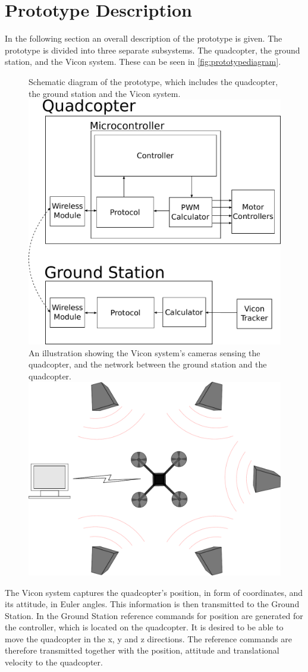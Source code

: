 \section{Prototype Description}\label{sec:PrototypeDescription}
In the following section an overall description of the prototype is given. %
The prototype is divided into three separate subsystems. The quadcopter, the ground station, and the Vicon system. These can be seen in \autoref{fig:prototypediagram}. 

\begin{figure}[H]
  \centering
  \captionbox
  {
    Schematic diagram of the prototype, which includes the quadcopter, the ground station and the Vicon system.
    \label{fig:prototypediagram}
  }
  {
    \includegraphics[width=.5\textwidth]{figures/prototypediagram}
  }
  \hspace{5pt}
  \captionbox
  {
   An illustration showing the Vicon system's cameras sensing the quadcopter, and the network between the ground station and the quadcopter. 
    \label{fig:Vicontotalsystem}
  }
  {
    \includegraphics[width=.40\textwidth]{figures/system.pdf}
  }
\end{figure}
The Vicon system captures the quadcopter's position, in form of coordinates, and its attitude, in Euler angles. This information is then transmitted to the Ground Station. In the Ground Station reference commands for position are generated for the controller, which is located on the quadcopter. It is desired to be able to move the quadcopter in the x, y and z directions. The reference commands are therefore transmitted together with the position, attitude and translational velocity to the quadcopter.

